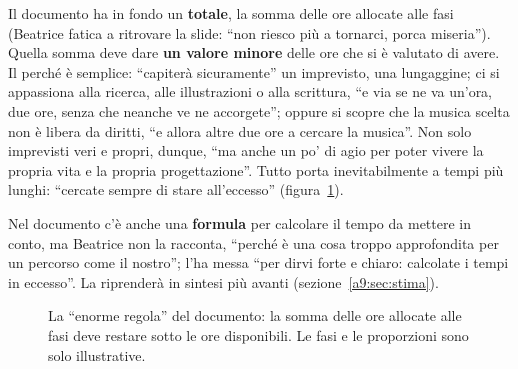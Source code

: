 Il documento ha in fondo un \textbf{totale}, la somma delle ore allocate alle fasi
(Beatrice fatica a ritrovare la slide: ``non riesco più a tornarci, porca
miseria''). Quella somma deve dare \textbf{un valore minore} delle ore che si è
valutato di avere. Il perché è semplice: ``capiterà sicuramente'' un imprevisto, una
lungaggine; ci si appassiona alla ricerca, alle illustrazioni o alla scrittura, ``e
via se ne va un'ora, due ore, senza che neanche ve ne accorgete''; oppure si scopre
che la musica scelta non è libera da diritti, ``e allora altre due ore a cercare la
musica''. Non solo imprevisti veri e propri, dunque, ``ma anche un po' di agio per
poter vivere la propria vita e la propria progettazione''. Tutto porta inevitabilmente
a tempi più lunghi: ``cercate sempre di stare all'eccesso''
(figura~\ref{a9:fig:margine}).

Nel documento c'è anche una \textbf{formula} per calcolare il tempo da mettere in
conto, ma Beatrice non la racconta, ``perché è una cosa troppo approfondita per un
percorso come il nostro''; l'ha messa ``per dirvi forte e chiaro: calcolate i tempi in
eccesso''. La riprenderà in sintesi più avanti (sezione~\ref{a9:sec:stima}).

\begin{figure}[htbp]
\centering
{}
\caption{La ``enorme regola'' del documento: la somma delle ore allocate alle fasi
deve restare sotto le ore disponibili. Le fasi e le proporzioni sono solo
illustrative.}
\label{a9:fig:margine}
\end{figure}

